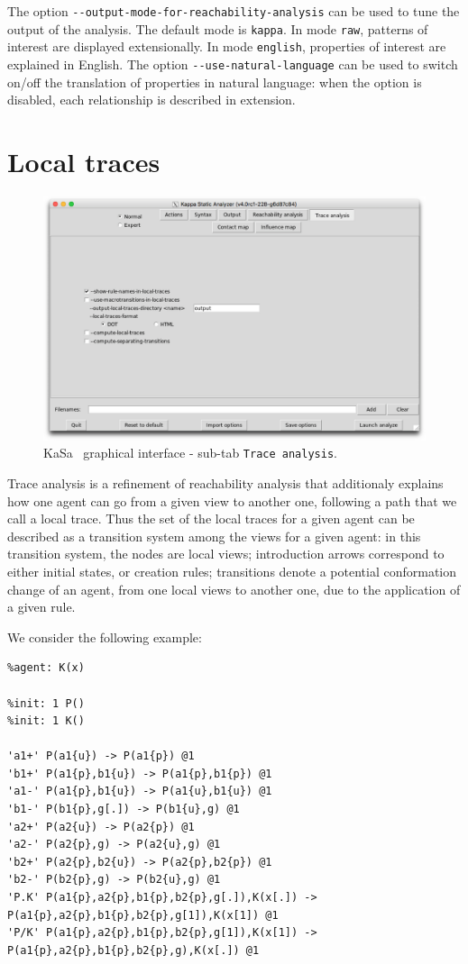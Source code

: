 \documentclass[11pt]{book}
\def\KaSa{\textsf{KaSa}}
\begin{document}
The option \verb?--output-mode-for-reachability-analysis? can be used to tune the output of the analysis. The default mode is \verb?kappa?.
In mode \verb?raw?, patterns of interest are displayed extensionally.
In mode \verb?english?, properties of interest are explained in English.
The option \verb?--use-natural-language? can be used to switch on/off the translation of properties in natural language: when the option is disabled, each relationship is described in extension.

\section{Local traces}
\label{sec:local-traces}


\begin{figure}[htbp]
\centering
\includegraphics[width=12cm]{img/kasa_4.png}
\caption{\KaSa~ graphical interface - sub-tab \texttt{Trace analysis}.}
\label{fig:kasa:3}
\end{figure}

Trace analysis is a refinement of reachability analysis that additionaly explains how one agent can go from a given view to another one, following a path that we call a local trace.
Thus the set of the local traces for a given agent can be described as a transition system among the views for a given agent: in this transition system, the nodes are local views; introduction arrows correspond to either initial states, or creation rules; transitions denote a potential conformation change of an agent, from one local views to another one, due to the application of a given rule.

We consider the following example:
\begin{lstlisting}[language=kappa]
%agent: P(a1{u,p},a2{u,p},b1{u,p},b2{u,p},g)
%agent: K(x)

%init: 1 P()
%init: 1 K()

'a1+' P(a1{u}) -> P(a1{p}) @1
'b1+' P(a1{p},b1{u}) -> P(a1{p},b1{p}) @1
'a1-' P(a1{p},b1{u}) -> P(a1{u},b1{u}) @1
'b1-' P(b1{p},g[.]) -> P(b1{u},g) @1
'a2+' P(a2{u}) -> P(a2{p}) @1
'a2-' P(a2{p},g) -> P(a2{u},g) @1
'b2+' P(a2{p},b2{u}) -> P(a2{p},b2{p}) @1
'b2-' P(b2{p},g) -> P(b2{u},g) @1
'P.K' P(a1{p},a2{p},b1{p},b2{p},g[.]),K(x[.]) -> P(a1{p},a2{p},b1{p},b2{p},g[1]),K(x[1]) @1
'P/K' P(a1{p},a2{p},b1{p},b2{p},g[1]),K(x[1]) -> P(a1{p},a2{p},b1{p},b2{p},g),K(x[.]) @1
\end{lstlisting}
\end{document}
